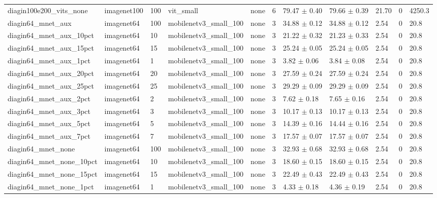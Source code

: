 \begin{tabular}{lllllllllll}
diagin100e200_vits_none & imagenet100 & 100 & vit_small & none & 6 & 79.47 $\pm$ 0.40 & 79.66 $\pm$ 0.39 & 21.70 & 0 & 4250.3 \\
diagin64_mnet_aux & imagenet64 & 100 & mobilenetv3_small_100 & none & 3 & 34.88 $\pm$ 0.12 & 34.88 $\pm$ 0.12 & 2.54 & 0 & 20.8 \\
diagin64_mnet_aux_10pct & imagenet64 & 10 & mobilenetv3_small_100 & none & 3 & 21.22 $\pm$ 0.32 & 21.23 $\pm$ 0.33 & 2.54 & 0 & 20.8 \\
diagin64_mnet_aux_15pct & imagenet64 & 15 & mobilenetv3_small_100 & none & 3 & 25.24 $\pm$ 0.05 & 25.24 $\pm$ 0.05 & 2.54 & 0 & 20.8 \\
diagin64_mnet_aux_1pct & imagenet64 & 1 & mobilenetv3_small_100 & none & 3 & 3.82 $\pm$ 0.06 & 3.84 $\pm$ 0.08 & 2.54 & 0 & 20.8 \\
diagin64_mnet_aux_20pct & imagenet64 & 20 & mobilenetv3_small_100 & none & 3 & 27.59 $\pm$ 0.24 & 27.59 $\pm$ 0.24 & 2.54 & 0 & 20.8 \\
diagin64_mnet_aux_25pct & imagenet64 & 25 & mobilenetv3_small_100 & none & 3 & 29.29 $\pm$ 0.09 & 29.29 $\pm$ 0.09 & 2.54 & 0 & 20.8 \\
diagin64_mnet_aux_2pct & imagenet64 & 2 & mobilenetv3_small_100 & none & 3 & 7.62 $\pm$ 0.18 & 7.65 $\pm$ 0.16 & 2.54 & 0 & 20.8 \\
diagin64_mnet_aux_3pct & imagenet64 & 3 & mobilenetv3_small_100 & none & 3 & 10.17 $\pm$ 0.13 & 10.17 $\pm$ 0.13 & 2.54 & 0 & 20.8 \\
diagin64_mnet_aux_5pct & imagenet64 & 5 & mobilenetv3_small_100 & none & 3 & 14.39 $\pm$ 0.16 & 14.44 $\pm$ 0.16 & 2.54 & 0 & 20.8 \\
diagin64_mnet_aux_7pct & imagenet64 & 7 & mobilenetv3_small_100 & none & 3 & 17.57 $\pm$ 0.07 & 17.57 $\pm$ 0.07 & 2.54 & 0 & 20.8 \\
diagin64_mnet_none & imagenet64 & 100 & mobilenetv3_small_100 & none & 3 & 32.93 $\pm$ 0.68 & 32.93 $\pm$ 0.68 & 2.54 & 0 & 20.8 \\
diagin64_mnet_none_10pct & imagenet64 & 10 & mobilenetv3_small_100 & none & 3 & 18.60 $\pm$ 0.15 & 18.60 $\pm$ 0.15 & 2.54 & 0 & 20.8 \\
diagin64_mnet_none_15pct & imagenet64 & 15 & mobilenetv3_small_100 & none & 3 & 22.49 $\pm$ 0.43 & 22.49 $\pm$ 0.43 & 2.54 & 0 & 20.8 \\
diagin64_mnet_none_1pct & imagenet64 & 1 & mobilenetv3_small_100 & none & 3 & 4.33 $\pm$ 0.18 & 4.36 $\pm$ 0.19 & 2.54 & 0 & 20.8 \\

\end{tabular}
